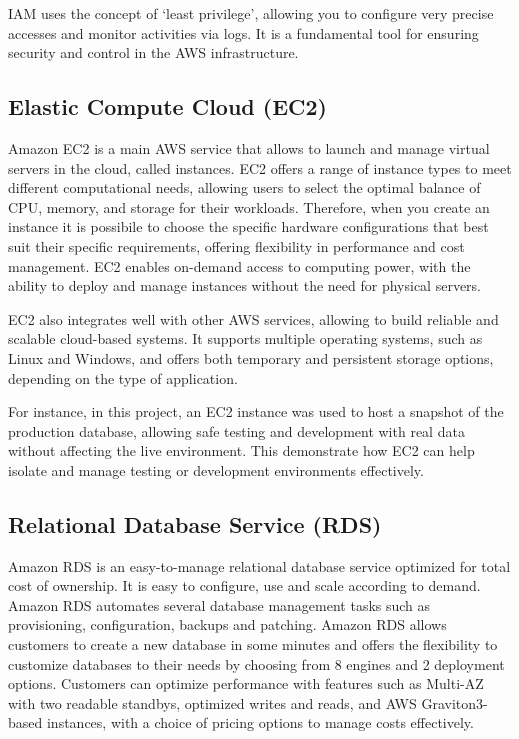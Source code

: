 IAM uses the concept of ‘least privilege’, allowing you to configure very precise accesses and monitor activities via logs. It is a fundamental tool for ensuring security and control in the \ac{AWS} infrastructure.
\subsection{Elastic Compute Cloud (EC2)}
Amazon \acf{EC2} is a main \ac{AWS} service that allows to launch and manage virtual servers in the cloud, called instances. \ac{EC2} offers a range of instance types to meet different computational needs, allowing users to select the optimal balance of CPU, memory, and storage for their workloads. Therefore, when you create an instance it is possibile to choose the specific hardware configurations that best suit their specific requirements, offering flexibility in performance and cost management. \ac{EC2} enables on-demand access to computing power, with the ability to deploy and manage instances without the need for physical servers.

\ac{EC2} also integrates well with other \ac{AWS} services, allowing to build reliable and scalable cloud-based systems. It supports multiple operating systems, such as Linux and Windows, and offers both temporary and persistent storage options, depending on the type of application.

For instance, in this project, an \ac{EC2} instance was used to host a snapshot of the production database, allowing safe testing and development with real data without affecting the live environment. This demonstrate how \ac{EC2} can help isolate and manage testing or development environments effectively.
\subsection{Relational Database Service (RDS)}
Amazon \ac{RDS} is an easy-to-manage relational database service optimized for total cost of ownership. It is easy to configure, use and scale according to demand. Amazon \ac{RDS} automates several database management tasks such as provisioning, configuration, backups and patching. Amazon \ac{RDS} allows customers to create a new database in some minutes and offers the flexibility to customize databases to their needs by choosing from 8 engines and 2 deployment options. Customers can optimize performance with features such as Multi-AZ with two readable standbys, optimized writes and reads, and \ac{AWS} Graviton3-based instances, with a choice of pricing options to manage costs effectively.

